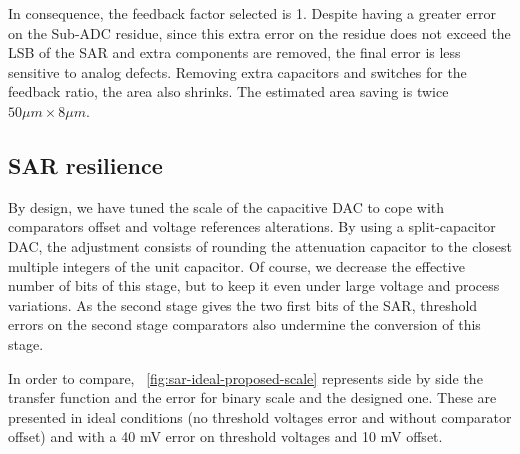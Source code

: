 In consequence, the feedback factor selected is 1. Despite having a greater error on the Sub-ADC residue, since this extra error on the residue does not exceed the LSB of the SAR and extra components are removed, the final error is less sensitive to analog defects. Removing extra capacitors and switches for the feedback ratio, the area also shrinks. The estimated area saving is twice $50 \mu m \times 8 \mu m$.

\subsection{SAR resilience}
By design, we have tuned the scale of the capacitive DAC to cope with comparators offset and voltage references alterations. By using a split-capacitor DAC, the adjustment consists of rounding the attenuation capacitor to the closest multiple integers of the unit capacitor. Of course, we decrease the effective number of bits of this stage, but to keep it even under large voltage and process variations. As the second stage gives the two first bits of the SAR, threshold errors on the second stage comparators also undermine the conversion of this stage.

In order to compare, \figurename~\ref{fig:sar-ideal-proposed-scale} represents side by side the transfer function and the error for binary scale and the designed one. These are presented in ideal conditions (no threshold voltages error and without comparator offset) and with a 40 mV error on threshold voltages and 10 mV offset.

